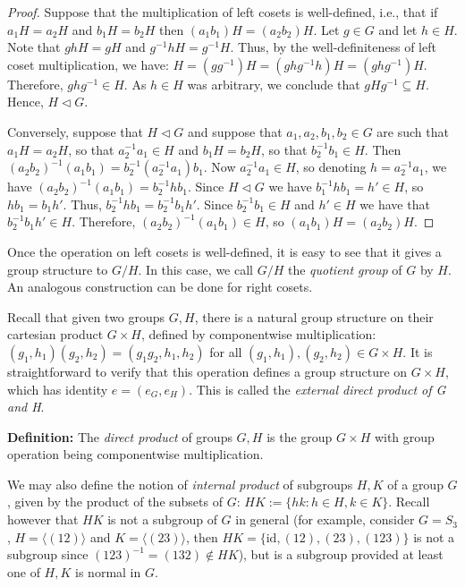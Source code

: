 \documentclass[12pt]{article}
\newcommand{\vs}{\vskip10pt}
\begin{document}
	\begin{proof}
		
		Suppose that the multiplication of left cosets is well-defined, i.e., that if $a_1H = a_2H$ and $b_1 H = b_2 H$ then $(a_1 b_1)H = (a_2 b_2)H$. Let $g \in G$ and let $h \in H$. Note that $ghH = gH$ and $g^{-1}hH = g^{-1}H$. Thus, by the well-definiteness of left coset multiplication, we have: $H = (gg^{-1})H = (ghg^{-1}h)H = (ghg^{-1})H$. Therefore, $ghg^{-1} \in H$. As $h \in H$ was arbitrary, we conclude that $gHg^{-1} \subseteq H$. Hence, $H \triangleleft G$. 
		
		\vs 
		
		Conversely, suppose that $H \triangleleft G$ and suppose that $a_1,a_2,b_1,b_2 \in G$ are such that $a_1 H = a_2 H$, so that $a_2^{-1}a_1 \in H$ and $b_1 H = b_2 H$, so that $b_2^{-1}b_1 \in H$. Then $(a_2 b_2)^{-1} (a_1 b_1) = b_2^{-1} (a_2^{-1} a_1) b_1$. Now $a_2^{-1}a_1 \in H$, so denoting $h = a_2^{-1}a_1$, we have $(a_2 b_2)^{-1} (a_1 b_1) = b_2^{-1} h b_1$. Since $H \triangleleft G$ we have $b_1^{-1}h b_1 = h' \in H$, so $h b_1 = b_1 h'$. Thus, $b_2^{-1} h b_1 = b_2^{-1} b_1 h'$. Since $b_2^{-1}b_1 \in H$ and $h' \in H$ we have that $b_2^{-1} b_1 h' \in H$. Therefore, $(a_2 b_2)^{-1} (a_1 b_1) \in H$, so $(a_1 b_1)H = (a_2 b_2)H$.
		
	\end{proof}

	Once the operation on left cosets is well-defined, it is easy to see that it gives a group structure to $G/H$. In this case, we call $G/H$ the \textit{quotient group} of $G$ by $H$. An analogous construction can be done for right cosets. 
	
	\vs
	
	Recall that given two groups $G, H$, there is a natural group structure on their cartesian product $G \times H$, defined by componentwise multiplication: $(g_1, h_1)(g_2, h_2) = (g_1 g_2, h_1, h_2)$ for all $(g_1, h_1),(g_2, h_2) \in G \times H$. It is straightforward to verify that this operation defines a group structure on $G \times H$, which has identity $e = (e_G, e_H)$. This is called the \textit{external direct product of G and H}.
	
	\vs
	
	\textbf{Definition: } The \textit{direct product} of groups $G,H$ is the group $G \times H$ with group operation being componentwise multiplication. 
	
	\vs 
	
	We may also define the notion of \textit{internal product} of subgroups $H,K$ of a group $G$, given by the product of the subsets of $G$: $HK := \{hk: h \in H, k \in K\}$. Recall however that $HK$ is not a subgroup of $G$ in general (for example, consider $G = S_3$, $H = \langle (12) \rangle$ and $K = \langle (23) \rangle$, then $HK = \{\text{id}, (12), (23), (123)\}$ is not a subgroup since $(123)^{-1} = (132) \notin HK$), but is a subgroup provided at least one of $H,K$ is normal in $G$. 
	
\end{document}
